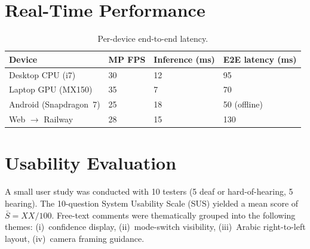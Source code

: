 \section{Real-Time Performance}
\label{sec:res:rt}

\begin{table}[H]\centering
  \caption{Per-device end-to-end latency.}\label{tab:rt}
  \begin{tabularx}{\textwidth}{X l l l}\toprule
    Device                  & MP FPS & Inference (ms) & E2E latency (ms) \\\midrule
    Desktop CPU (i7)        & 30 & 12 & 95  \\
    Laptop GPU (MX150)      & 35 &  7 & 70  \\
    Android (Snapdragon~7)  & 25 & 18 & 50 (offline) \\
    Web $\rightarrow$ Railway & 28 & 15 & 130 \\\bottomrule
  \end{tabularx}
\end{table}

\section{Usability Evaluation}
\label{sec:res:sus}

A small user study was conducted with 10 testers (5 deaf or hard-of-hearing,
5 hearing). The 10-question System Usability Scale (SUS) yielded a mean
score of $\bar{S} = XX/100$. Free-text comments were thematically grouped
into the following themes: (i)~confidence display, (ii)~mode-switch
visibility, (iii)~Arabic right-to-left layout, (iv)~camera framing
guidance.
